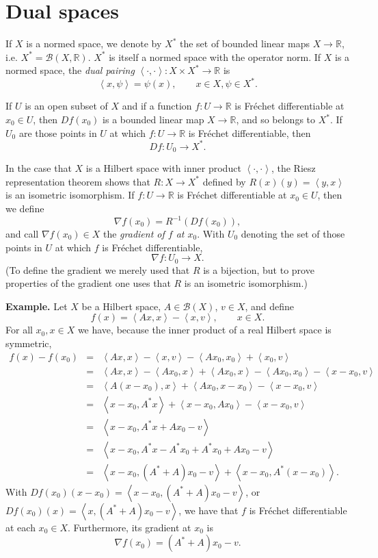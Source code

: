 \documentclass{article}
\newcommand{\inner}[2]{\left\langle #1, #2 \right\rangle}
\theoremstyle{definition}
\theoremstyle{definition}
\begin{document}
\section{Dual spaces}
If $X$ is a normed space, we denote by $X^*$  the set of bounded linear maps $X \to \mathbb{R}$, i.e. $X^*=\mathscr{B}(X,\mathbb{R})$. $X^*$ is itself a normed
space with the operator norm.
 If $X$ is a normed space, the {\em dual pairing} $\inner{\cdot}{\cdot}:X \times X^* \to \mathbb{R}$ is 
 \[
 \inner{x}{\psi}=\psi(x), \qquad x \in X, \psi \in X^*.
 \]


If $U$ is an open subset of $X$ and if a function $f:U \to \mathbb{R}$ is Fr\'echet differentiable at $x_0 \in U$, then
$Df(x_0)$ is a bounded linear map $X \to \mathbb{R}$, and so belongs to $X^*$. 
If $U_0$ are those points in $U$ at which $f:U \to \mathbb{R}$ is Fr\'echet differentiable, then
\[
Df:U_0 \to X^*.
\]

In the case that $X$ is a Hilbert space with inner product $\inner{\cdot}{\cdot}$,
 the Riesz representation theorem shows that
  $R:X \to X^*$ defined by  $R(x)(y)=\inner{y}{x}$ is an isometric isomorphism.
If $f:U \to \mathbb{R}$ is Fr\'echet differentiable at $x_0 \in U$, then we define
\[
\nabla f(x_0) = R^{-1}(Df(x_0)),
\]
and call $\nabla f(x_0) \in X$ the {\em gradient of $f$ at $x_0$}. 
With $U_0$ denoting the set of those points in $U$ at which $f$ is Fr\'echet differentiable,
\[
\nabla f:U_0 \to X.
\]
(To define the gradient we merely used that $R$ is a bijection,
but to prove properties of the gradient one uses that $R$ is an isometric isomorphism.)


\textbf{Example.} Let $X$ be a  Hilbert space, $A \in \mathscr{B}(X)$, $v \in X$, and define 
\[
f(x)=\inner{Ax}{x}-\inner{x}{v}, \qquad x \in X.
\]
For all $x_0,x \in X$ we have, because the inner product of a real Hilbert space is symmetric,
\begin{eqnarray*}
f(x)-f(x_0)&=&\inner{Ax}{x}-\inner{x}{v}-\inner{Ax_0}{x_0}+\inner{x_0}{v}\\
&=&\inner{Ax}{x}-\inner{Ax_0}{x}+\inner{Ax_0}{x} -\inner{Ax_0}{x_0}-\inner{x-x_0}{v}\\
&=&\inner{A(x-x_0)}{x}+\inner{Ax_0}{x-x_0} - \inner{x-x_0}{v}\\
&=&\inner{x-x_0}{A^*x}+\inner{x-x_0}{Ax_0} -\inner{x-x_0}{v}\\
&=&\inner{x-x_0}{A^*x+Ax_0-v}\\
&=&\inner{x-x_0}{A^*x-A^*x_0+A^*x_0+Ax_0-v}\\
&=&\inner{x-x_0}{(A^*+A)x_0-v}+ \inner{x-x_0}{A^*(x-x_0)}.
\end{eqnarray*}
With $Df(x_0)(x-x_0)=\inner{x-x_0}{(A^*+A)x_0-v}$, or $Df(x_0)(x)=\inner{x}{(A^*+A)x_0-v}$,  
we have that $f$ is Fr\'echet differentiable at each $x_0 \in X$.
Furthermore, its gradient at $x_0$ is
\[
\nabla f(x_0)=(A^*+A)x_0-v.
\]
\end{document}
